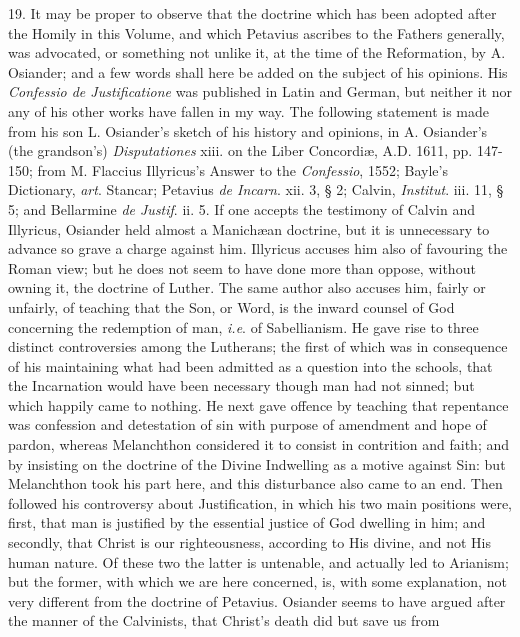 19. It may be proper to observe that the doctrine which has been
adopted after the Homily in this Volume, and which Petavius ascribes
to the Fathers generally, was advocated, or something not unlike it,
at the time of the Reformation, by A. Osiander; and a few words shall
here be added on the subject of his opinions. His \emph{Confessio de
Justificatione} was published in Latin and German, but neither it
nor any of his other works have fallen in my way. The following
statement is made from his son L. Osiander's sketch of his history and
opinions, in A. Osiander's (the grandson's) \emph{Disputationes} xiii.
on the Liber Concordiæ, A.D. 1611, pp. 147-150; from M. Flaccius
Illyricus's Answer to the \emph{Confessio}, 1552; Bayle's Dictionary, \emph{art}.
Stancar; Petavius \emph{de Incarn}. xii. 3, § 2; Calvin, \emph{Institut}.
iii. 11, § 5; and Bellarmine \emph{de Justif}. ii. 5. If one accepts
the testimony of Calvin and Illyricus, Osiander held almost a
Manichæan doctrine, but it is unnecessary to advance so grave a
charge against him. Illyricus accuses him also of favouring the Roman
view; but he does not seem to have done more than oppose, without
owning it, the doctrine of Luther. The same author also accuses him,
fairly or unfairly, of teaching that the Son, or Word, is the inward
counsel of God concerning the redemption of man, \emph{i.e}. of Sabellianism.
He gave rise to three distinct controversies among the Lutherans; the
first of which was in consequence of his maintaining what had been
admitted as a question into the schools, that the Incarnation would
have been necessary though man had not sinned; but which happily
came to nothing. He next gave offence by teaching that repentance was
confession and detestation of sin with purpose of amendment and hope
of pardon, whereas Melanchthon considered it to consist in contrition
and faith; and by insisting on the doctrine of the Divine Indwelling
as a motive against Sin: but Melanchthon took his part here, and this
disturbance also came to an end. Then followed his controversy about
Justification, in which his two main positions were, first, that man
is justified by the essential justice of God dwelling in him; and
secondly, that Christ is our righteousness, according to His divine,
and not His human nature. Of these two the latter is untenable, and
actually led to Arianism; but the former, with which we are here
concerned, is, with some explanation, not very different from the
doctrine of Petavius. Osiander seems to have argued after the manner
of the Calvinists, that Christ's death did but save us from
